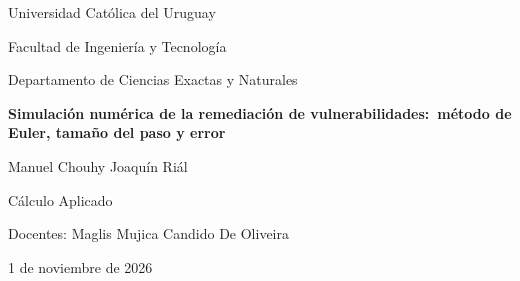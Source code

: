 \documentclass[11pt,a4paper]{article}
\begin{document}
\begin{titlepage}
  \centering
  \vspace*{2cm}
  {\Large Universidad Católica del Uruguay\par}
  {\large Facultad de Ingeniería y Tecnología\par}
  {\large Departamento de Ciencias Exactas y Naturales\par}
  \vspace{2.5cm}
  {\LARGE\bfseries Simulación numérica de la remediación de vulnerabilidades:\ método de Euler, tamaño del paso y error\par}
  \vspace{2cm}
  {\large Manuel Chouhy \quad Joaquín Riál\par}
  \vspace{2cm}
  {\large Cálculo Aplicado\par}
  {\large Docentes: Maglis Mujica \quad Candido De Oliveira\par}
  \vspace{1.5cm}
  {\large 1 de noviembre de 2026\par}
  \vfill
\end{titlepage}


\clearpage

\tableofcontents
\clearpage








\end{document}
